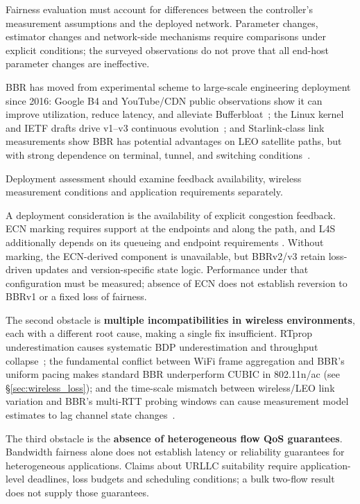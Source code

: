 \documentclass[a4paper,fleqn]{cas-sc}
\begin{document}
Fairness evaluation must account for differences between the controller's
measurement assumptions and the deployed network. Parameter changes,
estimator changes and network-side mechanisms require comparisons under
explicit conditions; the surveyed observations do not prove that all
end-host parameter changes are ineffective.

BBR has moved from experimental scheme to large-scale engineering deployment since
2016: Google B4 and YouTube/CDN public observations show it can improve
utilization, reduce latency, and alleviate
Bufferbloat~\citep{cardwell2017bbr}; the Linux kernel and IETF drafts drive v1--v3
continuous evolution~\citep{cardwell2017bbr,cardwell2019bbrv2,ietf_ccwg_bbr,abrol2026bbr};
and Starlink-class link measurements show BBR has potential advantages on LEO
satellite paths, but with strong dependence on terminal, tunnel, and switching
conditions~\citep{deutschmann2023starlink,kamel2024starquic}.

Deployment assessment should examine feedback availability, wireless
measurement conditions and application requirements separately.

A deployment consideration is the availability of explicit congestion
feedback. ECN marking requires support at the endpoints and along the path,
and L4S additionally depends on its queueing and endpoint requirements
\citep{rfc3168,rfc9330,rfc9331,rfc9332}. Without marking, the ECN-derived
component is unavailable, but BBRv2/v3 retain loss-driven updates and
version-specific state logic. Performance under that configuration must be
measured; absence of ECN does not establish reversion to BBRv1 or a fixed
loss of fairness.

The second obstacle is \textbf{multiple incompatibilities in wireless environments},
each with a different root cause, making a single fix insufficient. RTprop
underestimation causes systematic BDP underestimation and throughput
collapse~\citep{abrol2026bbr}; the fundamental conflict between WiFi frame
aggregation and BBR's uniform pacing makes standard BBR underperform CUBIC in
802.11n/ac (see \S\ref{sec:wireless_loss}); and the time-scale mismatch between
wireless/LEO link variation and BBR's multi-RTT probing windows can cause
measurement model estimates to lag channel state changes~\citep{wang2024bbr_leo,kamel2024starquic,laniewski2024road}.

The third obstacle is the \textbf{absence of heterogeneous flow QoS guarantees}.
Bandwidth fairness alone does not establish latency or reliability guarantees
for heterogeneous applications. Claims about URLLC suitability require
application-level deadlines, loss budgets and scheduling conditions;
a bulk two-flow result does not supply those guarantees.
\end{document}
